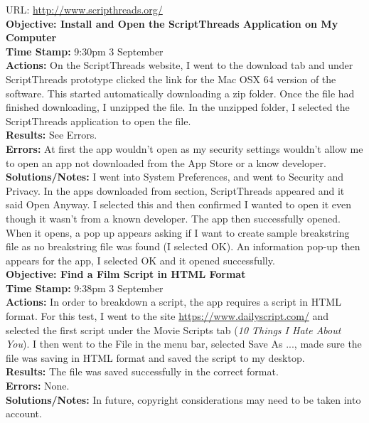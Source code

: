 \documentclass{article}
\begin{document}
URL: \url{http://www.scripthreads.org/}\\

\textbf{Objective: Install and Open the ScriptThreads Application on My Computer}\\
\textbf{Time Stamp:} 9:30pm 3 September\\
\textbf{Actions:} On the ScriptThreads website, I went to the download tab and under ScriptThreads prototype clicked the link for the Mac OSX 64 version of the software. This started automatically downloading a zip folder. Once the file had finished downloading, I unzipped the file. In the unzipped folder, I selected the ScriptThreads application to open the file.\\
\textbf{Results:} See Errors.\\
\textbf{Errors:} At first the app wouldn't open as my security settings wouldn't allow me to open an app not downloaded from the App Store or a know developer.\\
\textbf{Solutions/Notes:} I went into System Preferences, and went to Security and Privacy. In the apps downloaded from section, ScriptThreads appeared and it said Open Anyway. I selected this and then confirmed I wanted to open it even though it wasn't from a known developer. The app then successfully opened. When it opens, a pop up appears asking if I want to create sample breakstring file as no breakstring file was found (I selected OK). An information pop-up then appears for the app, I selected OK and it opened successfully. \\

\textbf{Objective: Find a Film Script in HTML Format}\\
\textbf{Time Stamp:} 9:38pm 3 September\\
\textbf{Actions:} In order to breakdown a script, the app requires a script in HTML format. For this test, I went to the site \url{https://www.dailyscript.com/} and selected the first script under the Movie Scripts tab (\textit{10 Things I Hate About You}). I then went to the File in the menu bar, selected Save As ..., made sure the file was saving in HTML format and saved the script to my desktop.\\
\textbf{Results:} The file was saved successfully in the correct format.\\
\textbf{Errors:} None.\\
\textbf{Solutions/Notes:} In future, copyright considerations may need to be taken into account.\\
\end{document}
